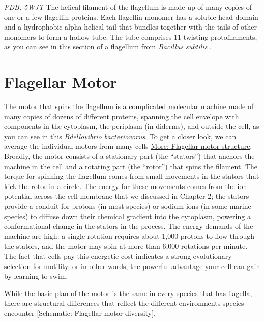 \documentclass[]{tufte-book}
\begin{document}
\emph{PDB: 5WJT}
The helical filament of the flagellum is made up of many copies of one or a few flagellin proteins. Each flagellin monomer has a soluble head domain and a hydrophobic alpha-helical tail that bundles together with the tails of other monomers to form a hollow tube. The tube comprises 11 twisting protofilaments, as you can see in this section of a flagellum from \emph{Bacillus subtilis} \citep{wang2017}.

\hypertarget{flagellar-motor}{%
\section{Flagellar Motor}\label{flagellar-motor}}

The motor that spins the flagellum is a complicated molecular machine made of many copies of dozens of different proteins, spanning the cell envelope with components in the cytoplasm, the periplasm (in diderms), and outside the cell, as you can see in this \emph{Bdellovibrio bacteriovorus}. To get a closer look, we can average the individual motors from many cells \protect\hyperlink{Flagellar_motor_structure}{More: Flagellar motor structure}. Broadly, the motor consists of a stationary part (the ``stators'') that anchors the machine in the cell and a rotating part (the ``rotor'') that spins the filament. The torque for spinning the flagellum comes from small movements in the stators that kick the rotor in a circle. The energy for these movements comes from the ion potential across the cell membrane that we discussed in Chapter 2; the stators provide a conduit for protons (in most species) or sodium ions (in some marine species) to diffuse down their chemical gradient into the cytoplasm, powering a conformational change in the stators in the process. The energy demands of the machine are high: a single rotation requires about 1,000 protons to flow through the stators, and the motor may spin at more than 6,000 rotations per minute. The fact that cells pay this energetic cost indicates a strong evolutionary selection for motility, or in other words, the powerful advantage your cell can gain by learning to swim.

While the basic plan of the motor is the same in every species that has flagella, there are structural differences that reflect the different environments species encounter {[}Schematic: Flagellar motor diversity{]}.



\hypertarget{htmlwidget-97aa29bbe3b7bf7aed34}{}
\end{document}
